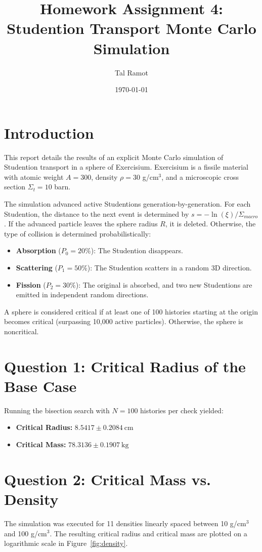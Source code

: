 \documentclass[11pt]{article}
\title{Homework Assignment 4: Studention Transport Monte Carlo Simulation}
\author{Tal Ramot}
\date{\today}
\begin{document}
\maketitle

\section*{Introduction}
This report details the results of an explicit Monte Carlo simulation of Studention transport in a sphere of Exercisium. Exercisium is a fissile material with atomic weight $A = 300$, density $\rho = 30$ g/cm$^3$, and a microscopic cross section $\Sigma_t = 10$ barn. 

The simulation advanced active Studentions generation-by-generation. For each Studention, the distance to the next event is determined by $s = -\ln(\xi) / \Sigma_{macro}$. If the advanced particle leaves the sphere radius $R$, it is deleted. Otherwise, the type of collision is determined probabilistically:
\begin{itemize}
    \item \textbf{Absorption} ($P_0 = 20\%$): The Studention disappears.
    \item \textbf{Scattering} ($P_1 = 50\%$): The Studention scatters in a random 3D direction.
    \item \textbf{Fission} ($P_2 = 30\%$): The original is absorbed, and two new Studentions are emitted in independent random directions.
\end{itemize}

A sphere is considered critical if at least one of 100 histories starting at the origin becomes critical (surpassing 10,000 active particles). Otherwise, the sphere is noncritical.

\section*{Question 1: Critical Radius of the Base Case}
Running the bisection search with $N = 100$ histories per check yielded:
\begin{itemize}
    \item \textbf{Critical Radius:} $8.5417 \pm 0.2084~\text{cm}$
    \item \textbf{Critical Mass:} $78.3136\pm  0.1907~\text{kg}$
\end{itemize}

\newpage
\section*{Question 2: Critical Mass vs. Density}
The simulation was executed for 11 densities linearly spaced between 10 g/cm$^3$ and 100 g/cm$^3$. The resulting critical radius and critical mass are plotted on a logarithmic scale in Figure~\ref{fig:density}.
\end{document}
